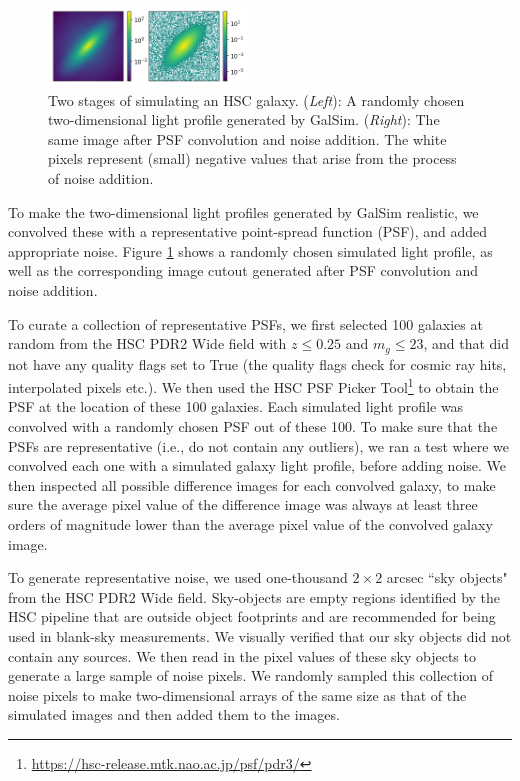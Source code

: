 \documentclass[twocolumn]{aastex63}
\begin{document}
\begin{CJK*}{UTF8}{gbsn}
\begin{figure}[htb]
    \centering
    \includegraphics[width = 0.47\textwidth]{sim_process.png}
    \caption{Two stages of simulating an HSC galaxy. (\textit{Left}): A randomly chosen two-dimensional light profile generated by GalSim. (\textit{Right}): The same image after PSF convolution and noise addition. The white pixels represent (small) negative values that arise from the process of noise addition.}
    \label{fig:sim_process}
\end{figure}

To make the two-dimensional light profiles generated by GalSim realistic, we convolved these with a representative point-spread function (PSF), and added appropriate noise. Figure \ref{fig:sim_process} shows a randomly chosen simulated light profile, as well as the corresponding image cutout generated after PSF convolution and noise addition. 

To curate a collection of representative PSFs, we first selected 100 galaxies at random from the HSC PDR2 Wide field \citep{hsc_pdr3} with $z \leq 0.25$ and $m_g \leq 23$, and that did not have any quality flags set to True (the quality flags check for cosmic ray hits, interpolated pixels etc.). We then used the HSC PSF Picker Tool\footnote{\href{https://hsc-release.mtk.nao.ac.jp/psf/pdr3/}{https://hsc-release.mtk.nao.ac.jp/psf/pdr3/}} to obtain the PSF at the location of these 100 galaxies. Each simulated light profile was convolved with a randomly chosen PSF out of these 100. To make sure that the PSFs are representative (i.e., do not contain any outliers), we ran a test where we convolved each one with a simulated galaxy light profile, before adding noise. 
We then inspected all possible difference images for each convolved galaxy, to make sure the average pixel value of the difference image was always at least three orders of magnitude lower than the average pixel value of the convolved galaxy image.

To generate representative noise, we used one-thousand $2\times2$ arcsec ``sky objects" from the HSC PDR2 Wide field. Sky-objects are empty regions identified by the HSC pipeline that are outside object footprints and are recommended for being used in blank-sky measurements. We visually verified that our sky objects did not contain any sources. We then read in the pixel values of these sky objects to generate a large sample of noise pixels. We randomly sampled this collection of noise pixels to make two-dimensional arrays of the same size as that of the simulated images and then added them to the images.


\end{CJK*}
\end{document}
